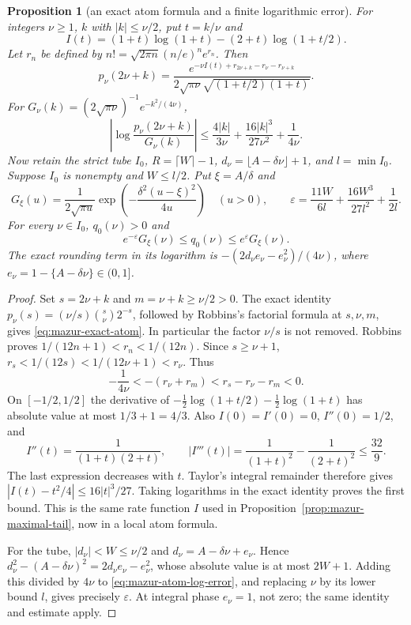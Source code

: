 \documentclass[11pt]{article}
\newtheorem{proposition}{Proposition}
\theoremstyle{remark}\newtheorem{remark}[proposition]{Remark}
\begin{document}
\begin{proposition}[an exact atom formula and a finite logarithmic error]
\label{prop:mazur-atom-gaussian}
For integers $\nu\ge1$, $k$ with $|k|\le\nu/2$, put $t=k/\nu$ and
\[
 I(t)=(1+t)\log(1+t)-(2+t)\log(1+t/2).
\]
Let $r_n$ be defined by
$n!=\sqrt{2\pi n}(n/e)^n e^{r_n}$. Then
\begin{equation}
 p_\nu(2\nu+k)=\frac{e^{-\nu I(t)+r_{2\nu+k}-r_\nu-r_{\nu+k}}}
 {2\sqrt{\pi\nu}\sqrt{(1+t/2)(1+t)}}.
 \label{eq:mazur-exact-atom}
\end{equation}
For $G_\nu(k)=(2\sqrt{\pi\nu})^{-1}e^{-k^2/(4\nu)}$,
\begin{equation}
 \left|\log\frac{p_\nu(2\nu+k)}{G_\nu(k)}\right|
 \le\frac{4|k|}{3\nu}+\frac{16|k|^3}{27\nu^2}+\frac1{4\nu}.
 \label{eq:mazur-atom-log-error}
\end{equation}
Now retain the strict tube $I_0$, $R=\lceil W\rceil-1$,
$d_\nu=\lfloor A-\delta\nu\rfloor+1$, and $l=\min I_0$.
Suppose $I_0$ is nonempty and $W\le l/2$. Put $\xi=A/\delta$ and
\[
 G_\xi(u)=\frac1{2\sqrt{\pi u}}
    \exp\!\left(-\frac{\delta^2(u-\xi)^2}{4u}\right)\quad(u>0),
 \qquad
 \varepsilon=\frac{11W}{6l}+\frac{16W^3}{27l^2}+\frac1{2l}.
\]
For every $\nu\in I_0$, $q_0(\nu)>0$ and
\begin{equation}
 e^{-\varepsilon}G_\xi(\nu)\le q_0(\nu)
                  \le e^\varepsilon G_\xi(\nu).
 \label{eq:mazur-rounded-gaussian}
\end{equation}
The exact rounding term in its logarithm is
$-(2d_\nu e_\nu-e_\nu^2)/(4\nu)$, where
$e_\nu=1-\{A-\delta\nu\}\in(0,1]$.
\end{proposition}
\begin{proof}
Set $s=2\nu+k$ and $m=\nu+k\ge\nu/2>0$. The exact identity
$p_\nu(s)=(\nu/s)\binom{s}{\nu}2^{-s}$, followed by Robbins's
factorial formula at $s,\nu,m$, gives
\eqref{eq:mazur-exact-atom}. In particular the factor $\nu/s$
is not removed. Robbins proves
$1/(12n+1)<r_n<1/(12n)$.
Since $s\ge\nu+1$,
$r_s<1/(12s)<1/(12\nu+1)<r_\nu$. Thus
\[
 -\frac1{4\nu}<-(r_\nu+r_m)<r_s-r_\nu-r_m<0.
\]
On $[-1/2,1/2]$ the derivative of
$-\tfrac12\log(1+t/2)-\tfrac12\log(1+t)$ has absolute value
at most $1/3+1=4/3$.
Also $I(0)=I'(0)=0$, $I''(0)=1/2$, and
\[
 I''(t)=\frac1{(1+t)(2+t)},\qquad
 |I'''(t)|=\frac1{(1+t)^2}-\frac1{(2+t)^2}\le\frac{32}{9}.
\]
The last expression decreases with $t$. Taylor's integral remainder
therefore gives $|I(t)-t^2/4|\le16|t|^3/27$.
Taking logarithms in the exact identity proves the first bound.
This is the same rate function $I$ used in
Proposition~\ref{prop:mazur-maximal-tail}, now in a local atom formula.

For the tube, $|d_\nu|<W\le\nu/2$ and
$d_\nu=A-\delta\nu+e_\nu$. Hence
$d_\nu^2-(A-\delta\nu)^2=2d_\nu e_\nu-e_\nu^2$,
whose absolute value is at most $2W+1$.
Adding this divided by $4\nu$ to
\eqref{eq:mazur-atom-log-error}, and replacing $\nu$ by its lower
bound $l$, gives precisely $\varepsilon$. At integral phase
$e_\nu=1$, not zero; the same identity and estimate apply.
\end{proof}
\end{document}
